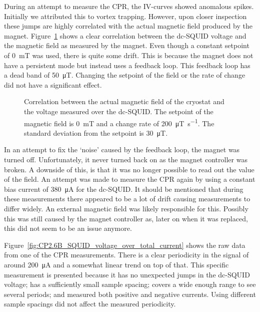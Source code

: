 During an attempt to measure the CPR, the IV-curves showed anomalous spikes. Initially we attributed this to vortex trapping. However, upon closer inspection these jumps are highly correlated with the actual magnetic field produced by the magnet. Figure~\ref{fig:CP2.6B_PPMS_magnetic_field_drift} shows a clear correlation between the dc-SQUID voltage and the magnetic field as measured by the magnet. Even though a constant setpoint of \qty{0}{\milli\tesla} was used, there is quite some drift. This is because the magnet does not have a persistent mode but instead uses a feedback loop. This feedback loop has a dead band of \qty{50}{\micro\tesla}. Changing the setpoint of the field or the rate of change did not have a significant effect.

\begin{figure}[ht!]
	\centering
	
	\caption{Correlation between the actual magnetic field of the cryostat and the voltage measured over the dc-SQUID. The setpoint of the magnetic field is \qty{0}{\milli\tesla} and a change rate of \qty{200}{\micro\tesla\per\second}. The standard deviation from the setpoint is \qty{30}{\micro\tesla}.}
	\label{fig:CP2.6B_PPMS_magnetic_field_drift}
\end{figure}

In an attempt to fix the `noise' caused by the feedback loop, the magnet was turned off. Unfortunately, it never turned back on as the magnet controller was broken. A downside of this, is that it was no longer possible to read out the value of the field. An attempt was made to measure the CPR again by using a constant bias current of \qty{380}{\micro\ampere} for the dc-SQUID. It should be mentioned that during these measurements there appeared to be a lot of drift causing measurements to differ widely. An external magnetic field was likely responsible for this. Possibly this was still caused by the magnet controller as, later on when it was replaced, this did not seem to be an issue anymore.

Figure~\ref{fig:CP2.6B_SQUID_voltage_over_total_current} shows the raw data from one of the CPR measurements. There is a clear periodicity in the signal of around \qty{200}{\micro\ampere} and a somewhat linear trend on top of that. This specific measurement is presented because it has no unexpected jumps in the dc-SQUID voltage; has a sufficiently small sample spacing; covers a wide enough range to see several periods; and measured both positive and negative currents. Using different sample spacings did not affect the measured periodicity.

